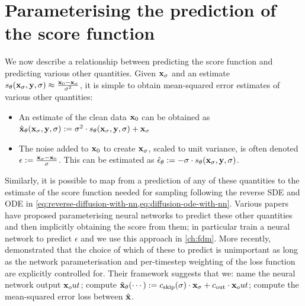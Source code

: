 \section{Parameterising the prediction of the score function}
We now describe a relationship between predicting the score function and predicting various other quantities. Given ${\mathbf{x}}_\sigma$ and an estimate $s_\theta({\mathbf{x}}_\sigma, {\mathbf{y}}, \sigma) \approx \frac{{\mathbf{x}}_0-{\mathbf{x}}_\sigma}{\sigma^2}$, it is simple to obtain mean-squared error estimates of various other quantities: 
\begin{itemize}
    \item An estimate of the clean data ${\mathbf{x}}_0$ can be obtained as ${\hat{{\mathbf{x}}}_\theta({\mathbf{x}}_\sigma, {\mathbf{y}}, \sigma) :=  \sigma^2 \cdot s_\theta({\mathbf{x}}_\sigma, {\mathbf{y}}, \sigma) + {\mathbf{x}}_\sigma}$
    \item The noise added to ${\mathbf{x}}_0$ to create ${\mathbf{x}}_\sigma$, scaled to unit variance, is often denoted $\epsilon := \frac{{\mathbf{x}}_\sigma-{\mathbf{x}}_0}{\sigma}$. This can be estimated as $\hat{\epsilon}_\theta := - \sigma \cdot s_\theta({\mathbf{x}}_\sigma, {\mathbf{y}}, \sigma)$.
\end{itemize}

Similarly, it is possible to map from a prediction of any of these quantities to the estimate of the score function needed for sampling following the reverse SDE and ODE in \cref{eq:reverse-diffusion-with-nn,eq:diffusion-ode-with-nn}. Various papers have proposed parameterising neural networks to predict these other quantities~\cite{ho2020denoising,sohl2015deep} and then implicitly obtaining the score from them; in particular \citet{ho2020denoising} train a neural network to predict $\epsilon$ and we use this approach in \cref{ch:fdm}. More recently, \citet{karras2022elucidating} demonstrated that the choice of which of these to predict is unimportant as long as the network parameterisation and per-timestep weighting of the loss function are explicitly controlled for. Their framework suggests that we: name the neural network output ${\mathbf{x}}_out$; compute $\hat{{\mathbf{x}}}_\theta(\cdots) := c_\text{skip}(\sigma) \cdot {\mathbf{x}}_\sigma + c_\text{out} \cdot {\mathbf{x}}_out$; compute the mean-squared error loss between $\hat{{\mathbf{x}}}$.

